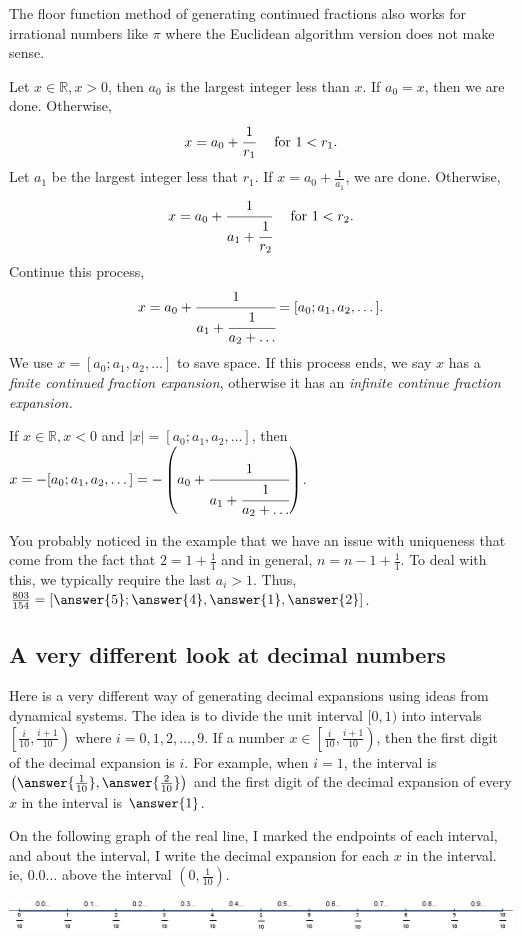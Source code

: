 \documentclass{ximera}
\begin{document}
The floor function method of generating continued fractions also works for irrational numbers like $\pi$ where the Euclidean algorithm version does not make sense. 
\begin{definition}
 Let $x\in\mathbb{R},x>0$, then $a_0$ is the largest integer less than $x$. If $a_0=x$, then we are done. Otherwise,
\[x=a_0+\cfrac{1}{r_1}\quad\textrm{ for }1<r_1.\] 
Let $a_1$ be the largest integer less that $r_1$. If $x=a_0+\frac{1}{a_1}$, we are done. Otherwise,
\[x=a_0+\cfrac{1}{a_1+\cfrac{1}{r_2}}\quad\textrm{ for }1<r_2.\] 
Continue this process, 
\[x=a_0+\cfrac{1}{a_1+\cfrac{1}{a_2+\dots}}=[a_0;a_1,a_2,\dots].\]
We use $x=[a_0;a_1,a_2,\dots]$ to save space.
If this process ends, we say $x$ has a \emph{finite continued fraction expansion}, otherwise it has an \emph{infinite continue fraction expansion.}

If $x\in\mathbb{R}, x<0$ and $|x|=[a_0;a_1,a_2,\dots]$, then $x=-[a_0;a_1,a_2,\dots]=-\left(a_0+\cfrac{1}{a_1+\cfrac{1}{a_2+\dots}}\right)$.
\end{definition}

You probably noticed in the example that we have an issue with uniqueness that come from the fact that $2=1+\frac{1}{1}$ and in general, $n=n-1+\frac{1}{1}$. To deal with this, we typically require the last $a_i>1$.
Thus, $\frac{803}{154}=[\answer{5};\answer{4},\answer{1},\answer{2}]$.

\subsection{A very different look at decimal numbers}
Here is a very different way of generating decimal expansions using ideas from dynamical systems. The idea is to divide the unit interval $[0,1)$ into intervals $\left[\frac{i}{10},\frac{i+1}{10}\right)$ where $i=0,1,2,\dots,9$. If a number $x\in\left[\frac{i}{10},\frac{i+1}{10}\right)$, then the first digit of the decimal expansion is $i$. For example, when $i=1$, the interval is $\left(\answer{\frac{1}{10}},\answer{\frac{2}{10}}\right)$ and the first digit of the decimal expansion of every $x$ in the interval is $\answer{1}$. 

On the following graph of the real line, I marked the endpoints of each interval, and about the interval, I write the decimal expansion for each $x$ in the interval. ie, $0.0\dots$ above the interval $\left(0,\frac{1}{10}\right)$.

\begin{image}
 \includegraphics[width=\textwidth]{decimalcylinder.eps}
\end{image}
\end{document}
